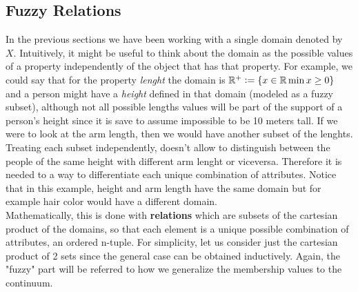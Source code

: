 

\begin{example}
\end{example}



\subsection{Fuzzy Relations}

In the previous sections we have been working with a single domain denoted by $X$. Intuitively, it might be useful to think about the domain as the possible values of a property independently of the object that has that property. For example, we could say that for the property \textit{lenght} the domain is $\mathbb{R}^+\mathrel{\mathop:}=
\{x\in\mathbb{R} \min x \geq 0\}$ and a person might have a \textit{height} defined in that domain (modeled as a fuzzy subset), although not all possible lengths values will be part of the support of a person's height since it is save to assume impossible to be 10 meters tall. If we were to look at the arm length, then we would have another subset of the lenghts. Treating each subset independently, doesn't allow to distinguish between the people of the same height with different arm lenght or viceversa. Therefore it is needed to a way to differentiate each unique combination of attributes. Notice that in this example, height and arm length have the same domain but for example hair color would have a different domain.\\

Mathematically, this is done with \textbf{relations} which are subsets of the cartesian product of the domains, so that each element is a unique possible combination of attributes, an ordered n-tuple. For simplicity, let us consider just the cartesian product of 2 sets since the general case can be obtained inductively. Again, the "fuzzy" part will be referred to how we generalize the membership values to the continuum.\\


